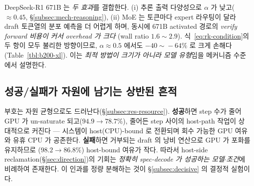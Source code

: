 DeepSeek-R1 671B 는 \emph{두 효과}를 결합한다.
(i) 추론 출력 다양성으로 $\alpha$ 가 낮고($\approx0.45$, \S\ref{subsec:mech-reasoning}),
(ii) MoE 는 토큰마다 expert 라우팅이 달라 draft 토큰열의 분포 예측을 더 어렵게 하며,
동시에 671B activated 경로의 \emph{verify forward 비용이 커서 overhead 가 크다}
(wall ratio $1.6\!\sim\!2.9$).
식~\ref{eq:rk-condition}의 두 항이 모두 불리한 방향이므로,
$\alpha\approx0.5$ 에서도 $-40\!\sim\!-64\%$ 로 크게 손해다(Table~\ref{tbl:b200-xl}).
이는 \emph{최적 방법이 크기가 아니라 모델 유형}임을 메커니즘 수준에서 설명한다.

\subsection{성공/실패가 자원에 남기는 상반된 흔적}
\label{subsec:mech-resource}

부호는 자원 균형으로도 드러난다(\S\ref{subsec:res-resource}).
\textbf{성공}하면 step 수가 줄어 GPU 가 un-saturate 되고($94.9\!\to\!78.7\%$),
줄어든 step 사이의 host-path 작업이 상대적으로 커진다 ---
시스템이 host(CPU)-bound 로 전환되며 회수 가능한 GPU 여유와 유휴 CPU 가 공존한다.
\textbf{실패}하면 거부되는 draft 의 낭비 연산으로 GPU 가 포화를 유지하므로
($98.2\!\to\!86.8\%$) host-bound 여유가 작다.
따라서 host-side reclamation(\S\ref{sec:direction})의 기회는
\emph{정확히 spec-decode 가 성공하는 모델$\cdot$조건}에 비례하여 존재한다.
이 인과를 정량 분해하는 것이 \S\ref{subsec:decisive} 의 결정적 실험이다.
